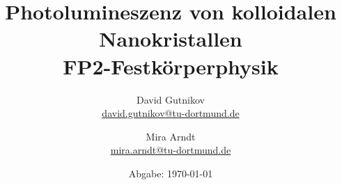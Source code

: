 

\title{Photolumineszenz von kolloidalen Nanokristallen\\
\small{FP2-Festkörperphysik}}
\author{%
  David Gutnikov\\%
  \href{mailto:david.gutnikov@tu-dortmund.de}{david.gutnikov@tu-dortmund.de} \and
  Mira Arndt\\
  \href{mailto:mira.arndt@tu-dortmund.de}{mira.arndt@tu-dortmund.de}%
}
\date{
  Abgabe: \today %
}
\publishers{TU Dortmund – Fakultät Physik}
\makeatletter         
\def\@maketitle{
\raggedright
\texttt{[image: bilder/lo\_TU-Do\_2008/logo\_rgb\_jpg/tud\_logo\_rgb.jpg]}\\[8ex]
\begin{center}
{\Huge \bfseries \sffamily \@title }\\[4ex] 
{\Large  \@author}\\[4ex] 
\@date\\[8ex]
\publishers\\
\end{center}}
\makeatother





\maketitle
\thispagestyle{empty}
\tableofcontents
\newpage
%
%

 
 \newpage
 \nocite{*}
 \printbibliography

